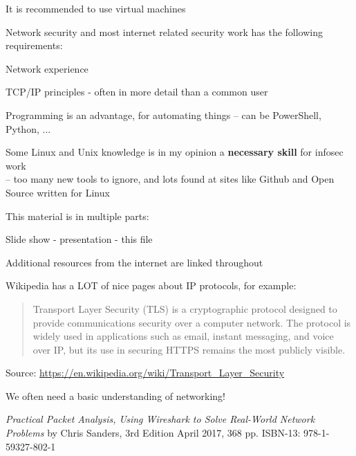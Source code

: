 \documentclass[Screen16to9,17pt]{foils}
\begin{document}
\begin{list1}
\item It is recommended to use virtual machines
\item Network security and most internet related security work has the following requirements:
\begin{list2}
\item Network experience
\item TCP/IP principles - often in more detail than a common user
\item Programming is an advantage, for automating things -- can be PowerShell, Python, ...
\item Some Linux and Unix knowledge is in my opinion a {\bf necessary skill} for infosec work\\
-- too many new tools to ignore, and lots found at sites like Github and Open Source written for Linux
\end{list2}
\end{list1}





This material is in multiple parts:
\begin{list2}
\item Slide show - presentation - this file
\item Additional resources from the internet are linked throughout
\item Wikipedia has a LOT of nice pages about IP protocols, for example:
\end{list2}

\begin{quote}\small
Transport Layer Security (TLS) is a cryptographic protocol designed to provide communications security over a computer network. The protocol is widely used in applications such as email, instant messaging, and voice over IP, but its use in securing HTTPS remains the most publicly visible.
\end{quote}
Source: \url{https://en.wikipedia.org/wiki/Transport_Layer_Security}


We often need a basic understanding of networking!


\emph{Practical Packet Analysis,
Using Wireshark to Solve Real-World Network Problems}
by Chris Sanders, 3rd Edition
April 2017, 368 pp.
ISBN-13:
978-1-59327-802-1
\end{document}
